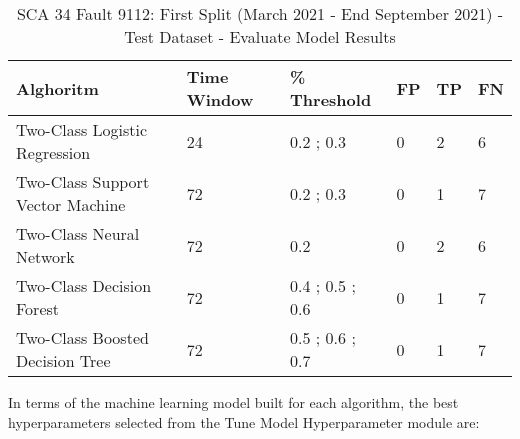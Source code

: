 \begin{table}[!ht]
    \centering
    \begin{tabular}{|l|l|l|l|l|l|}
    \hline
        Alghoritm & Time Window & \% Threshold & FP & TP & FN \\ \hline
        Two-Class Logistic Regression & 24 & 0.2 ; 0.3 & 0 & 2 & 6 \\ \hline
        Two-Class Support Vector Machine & 72 & 0.2 ; 0.3 & 0 & 1 & 7 \\ \hline
        Two-Class Neural Network & 72 & 0.2 & 0 & 2 & 6 \\ \hline
        Two-Class Decision Forest & 72 & 0.4 ; 0.5 ; 0.6 & 0 & 1 & 7 \\ \hline
        Two-Class Boosted Decision Tree & 72 & 0.5 ; 0.6 ; 0.7 & 0 & 1 & 7 \\ \hline
    \end{tabular}
    \caption{SCA 34 Fault 9112: First Split (March 2021 - End September 2021) - Test Dataset - Evaluate Model Results}
    \label{9112_SCA34_1st}
\end{table}

In terms of the machine learning model built for each algorithm, the best hyperparameters selected from the Tune Model Hyperparameter module are:

